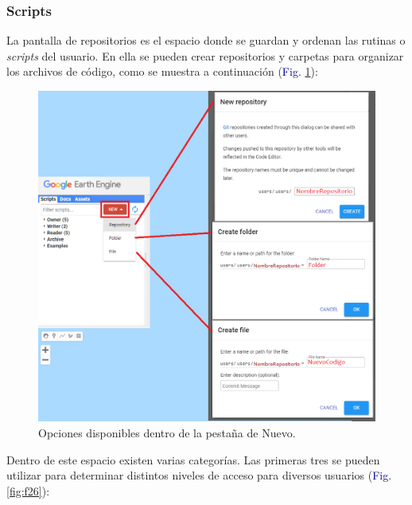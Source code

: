 \documentclass[
  12pt,
  letterpaper,
  twoside]{book}
\begin{document}
\hypertarget{scripts}{%
\subsubsection*{Scripts}\label{scripts}}

La pantalla de repositorios es el espacio donde se guardan y ordenan las rutinas o \emph{scripts} del usuario. En ella se pueden crear repositorios y carpetas para organizar los archivos de código, como se muestra a continuación (\textcolor{darkblue}{Fig.} \ref{fig:f25}):

\begin{figure}[H]

{\centering \includegraphics[width=0.8\linewidth]{Img/repofolderfile} 

}

\caption{Opciones disponibles dentro de la pestaña de Nuevo.}\label{fig:f25}
\end{figure}

Dentro de este espacio existen varias categorías. Las primeras tres se pueden utilizar para determinar distintos niveles de acceso para diversos usuarios (\textcolor{darkblue}{Fig.} \ref{fig:f26}):
\end{document}

